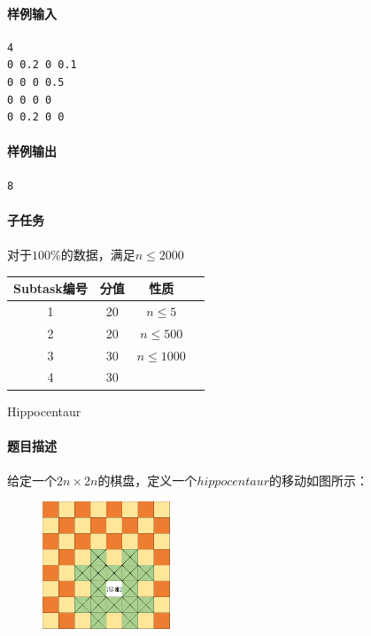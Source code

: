 \documentclass[UTF8]{ctexart}
\begin{document}
\paragraph{样例输入}
\begin{lstlisting}
4
0 0.2 0 0.1
0 0 0 0.5
0 0 0 0 
0 0.2 0 0
\end{lstlisting}
\paragraph{样例输出}
\begin{lstlisting}
8
\end{lstlisting}
\paragraph{子任务}
\paragraph{}对于$100\%$的数据，满足$n\le 2000$
\begin{center}
	\begin{tabular}{|c|c|c|c|}
		\hline
		Subtask编号&分值&性质\\
		\hline
		1&20&$n\le5$\\
		\hline
		2&20&$n\le 500$\\
		\hline
		3&30&$n\le 1000$\\
		\hline
		4&30&\\
		\hline
	\end{tabular}	
\end{center}

\clearpage
\begin{center}
	\large{Hippocentaur}
\end{center}
\paragraph{题目描述}
\paragraph{}给定一个$2n\times 2n$的棋盘，定义一个$hippocentaur$的移动如图所示：
\begin{figure}[htbp]
\centering\includegraphics[width=1.5in]{inprob.png}
\end{figure}
\end{document}
